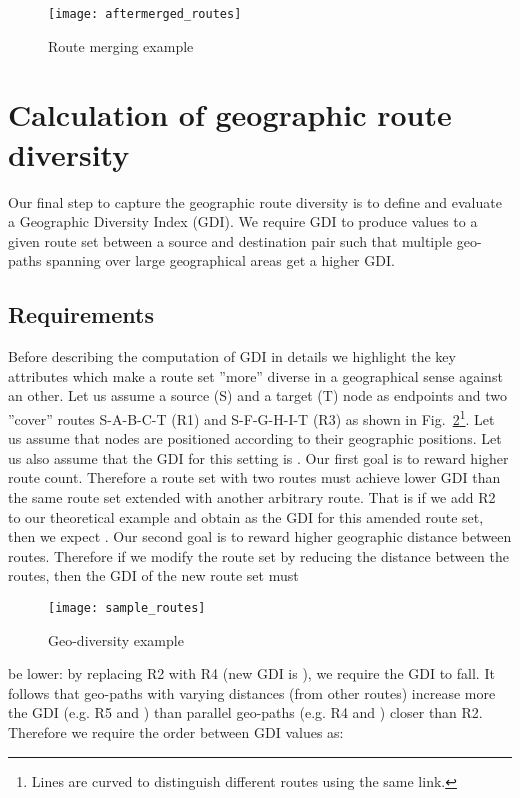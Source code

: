 \documentclass[peerreview]{IEEEtran}
\begin{document}
\begin{figure}[h]
	\centering
	\texttt{[image: aftermerged\_routes]}
	\caption{Route merging example}
	\label{fig:route_merging}
\end{figure}


\section{Calculation of geographic route diversity} \label{sec:sim} 

Our final step to capture the geographic route diversity is to define and
evaluate a Geographic Diversity Index (GDI). We require GDI to produce values to
a given route set between a source and destination pair such that multiple
geo-paths spanning over large geographical areas get a higher GDI.

\subsection{Requirements}\label{sec:req}
Before describing the computation of GDI in details we highlight the key
attributes which make a route set ''more'' diverse in a geographical sense
against an other. Let us assume a source (S) and a target (T) node as endpoints
and two ''cover'' routes S-A-B-C-T (R1) and S-F-G-H-I-T (R3) as shown in
Fig.~\ref{fig:route_example}\footnote{Lines are curved to distinguish different
  routes using the same link.}. Let us assume that nodes are positioned
according to their geographic positions. Let us also assume that the GDI for
this setting is . Our first goal is to reward higher route count.
Therefore a route set with two routes must achieve lower GDI than the same route
set extended with another arbitrary route. That is if we add R2 to our
theoretical example and obtain  as the GDI for this amended route
set, then we expect . Our second goal is to reward higher
geographic distance between routes. Therefore if we modify the route set by
reducing the distance between the routes, then the GDI of the new route set must
\begin{figure}[h]
  \centering
  \texttt{[image: sample\_routes]}
  \caption{Geo-diversity example}
  \label{fig:route_example}
\end{figure}
be lower: by replacing R2 with R4 (new GDI is ), we require the GDI
to fall. It follows that geo-paths with varying distances (from other routes)
increase more the GDI (e.g. R5 and ) than parallel geo-paths (e.g. R4
and ) closer than R2. Therefore we require the order between GDI
values as:
\end{document}
